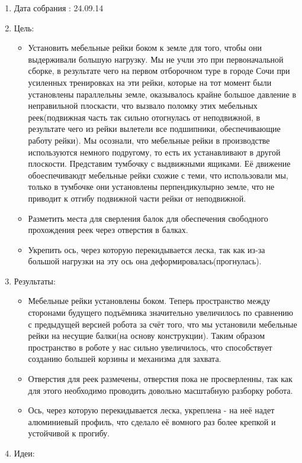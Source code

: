 
  \begin{enumerate}
    \item Дата собрания : 24.09.14
    \item Цель:
    \begin{itemize}
      \item Установить мебельные рейки боком к земле для того, чтобы они выдерживали большую нагрузку. Мы не учли это при первоначальной сборке, в результате чего на первом отборочном туре в городе Сочи при усиленных тренировках на эти рейки, которые на тот момент были установлены параллельны земле, оказывалось крайне большое давление в неправильной плоскасти, что вызвало поломку этих мебельных реек(подвижная часть так сильно отогнулась от неподвижной, в результате чего из рейки вылетели все подшипники, обеспечивающие работу рейки). Мы осознали, что мебельные рейки в производстве используются немного подругому, то есть их устанавливают в другой плоскости. Представим тумбочку с выдвижными ящиками. Её движение обоеспечиваюдт мебельные рейки схожие с теми, что использовали мы, только в тумбочке они установлены перпендикулырно земле, что не приводит к отгибу подвижной части рейки от неподвижной.
      \item Разметить места для сверления балок для обеспечения свободного прохождения реек через отверстия в балках.
      \item Укрепить ось, через которую перекидывается леска, так как из-за большой нагрузки на эту ось она деформировалась(прогнулась).
    \end{itemize}
    \item Результаты:
    \begin{itemize}
      \item Мебельные рейки установлены боком. Теперь пространство между сторонами будущего подъёмника значительно увеличилось по сравнению с предыдущей версией робота за счёт того, что мы установили мебельные рейки на несущие балки(на основу конструкции). Таким образом пространство в роботе у нас сильно увеличилось, что способствует созданию большей корзины и механизма для захвата.
      \item Отверстия для реек размечены, отверстия пока не просверленны, так как для этого необходимо проводить довольно масштабную разборку робота.
      \item Ось, через которую перекидывается леска, укреплена - на неё надет алюминиевый профиль, что сделало её вомного раз более крепкой и устойчивой к прогибу.
    \end{itemize} 
    \item Идеи:

\end{enumerate}
